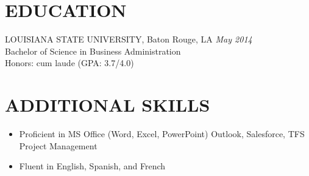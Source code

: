 \documentclass[11pt,letterpaper]{article}
\begin{document}
\vspace{1em}
\section*{EDUCATION}
\vspace{0.5em}
LOUISIANA STATE UNIVERSITY, Baton Rouge, LA \hfill \textit{May 2014} \\
Bachelor of Science in Business Administration \\
Honors: cum laude (GPA: 3.7/4.0)

\vspace{1.5em}
\section*{ADDITIONAL SKILLS}

\begin{multicols}{2}
\begin{itemize}[noitemsep,topsep=0pt]
    \item Proficient in MS Office (Word, Excel, PowerPoint) Outlook, Salesforce, TFS Project Management
    \item Fluent in English, Spanish, and French
\end{itemize}  
\end{multicols}
\end{document}
